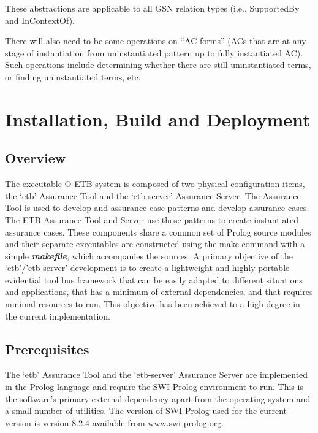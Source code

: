 \documentclass[12pt,twoside,a4paper]{article}
\begin{document}
These abstractions are applicable to all GSN relation types (i.e., SupportedBy and InContextOf).

There will also need to be some operations on ``AC forms'' (ACs that are at any stage of instantiation from uninstantiated pattern up to fully instantiated AC). Such operations include determining whether there are still uninstantiated terms, or finding uninstantiated terms, etc.

\clearpage
\hypertarget{installation-build-and-deployment}{%
\section{Installation, Build and Deployment}\label{installation-build-and-deployment}}

\hypertarget{overview}{%
\subsection{Overview}\label{overview}}

The executable O-ETB system is composed of two physical configuration items, the `etb' Assurance Tool and the `etb-server' Assurance Server. The Assurance Tool is used to develop and assurance case patterns and develop assurance cases. The ETB Assurance Tool and Server use those patterns to create instantiated assurance cases. These components share a common set of Prolog source modules and their separate executables are constructed using the make command with a simple \emph{\textbf{makefile}}, which accompanies the sources. A primary objective of the `etb'/'etb-server' development is to create a lightweight and highly portable evidential tool bus framework that can be easily adapted to different situations and applications, that has a minimum of external dependencies, and that requires minimal resources to run. This objective has been achieved to a high degree in the current implementation.

\hypertarget{prerequisites}{%
\subsection{Prerequisites}\label{prerequisites}}

The `etb' Assurance Tool and the `etb-server' Assurance Server are implemented in the Prolog language and require the SWI-Prolog environment to run. This is the software's primary external dependency apart from the operating system and a small number of utilities. The version of SWI-Prolog used for the current version is version 8.2.4 available from \href{http://www.swi-prolog.org}{www.swi-prolog.org}.
\end{document}
